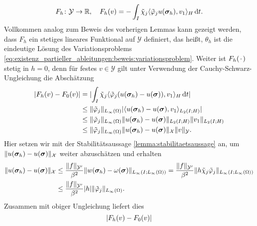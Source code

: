 \documentclass[../main.tex]{subfiles}
\begin{document}
\begin{Satz}
\begin{Beweis}
\begin{equation}
            F_{h} \colon \mathcal Y \to \mathbb{R}, \quad F_{h}(v) = - \int_{I} \tilde{\chi}_{j} \langle\tilde{\varphi}_{j}  u(\bm\sigma_{h}),v_{1}\rangle_{H} \mathop{}\!\mathrm{d} t.
        \end{equation}
        Vollkommen analog zum Beweis des vorherigen Lemmas kann gezeigt werden, dass $F_{h}$ ein stetiges lineares Funktional auf $\mathcal Y$ definiert, das heißt, $\theta_{h}$ ist die eindeutige Lösung des Variationsproblems \cref{eq:existenz_partieller_ableitungen:beweis:variationsproblem}.
        Weiter ist $F_{h}({\mkern2mu\cdot\mkern2mu})$ stetig in $h = 0$, denn für festes $v \in \mathcal Y$ gilt unter Verwendung der Cauchy-Schwarz-Ungleichung die Abschätzung
        \begin{align}
            \lvert F_{h}(v) - F_{0}(v)\rvert
            &= \lvert\int_{I} \tilde{\chi}_{j} \langle\tilde{\varphi}_{j}  (u(\bm\sigma_{h}) - u(\bm\sigma)),v_{1}\rangle_{H} \mathop{}\!\mathrm{d} t \rvert
            \\&\leq \lVert\tilde{\varphi}_{j}\rVert_{L_{\infty}(\Omega)} \lvert\langle u(\bm\sigma_{h}) - u(\bm\sigma),v_{1}\rangle_{L_{2}(I; H)} \rvert
            \\&\leq \lVert\tilde{\varphi}_{j}\rVert_{L_{\infty}(\Omega)} \lVert u(\bm\sigma_{h}) - u(\bm\sigma)\rVert_{L_{2}(I; H)} \lVert v_{1}\rVert_{L_{2}(I; H)}
            \\&\leq \lVert\tilde{\varphi}_{j}\rVert_{L_{\infty}(\Omega)} \lVert u(\bm\sigma_{h}) - u(\bm\sigma)\rVert_{\mathcal X} \lVert v\rVert_{\mathcal Y}.
        \end{align}
        Hier setzen wir mit der Stabilitätsaussage \cref{lemma:stabilitaetsaussage} an, um $\lVert u(\bm\sigma_{h}) - u(\bm\sigma)\rVert_{\mathcal X}$ weiter abzuschätzen und erhalten
        \begin{equation}
            \begin{aligned}
                \lVert u(\bm\sigma_{h}) - u(\bm\sigma)\rVert_{\mathcal X}
                &\leq \frac{\lVert f\rVert_{\mathcal Y'}}{\beta^{2}} \lVert w(\bm\sigma_{h}) - \omega(\bm\sigma)\rVert_{L_{\infty}(I; L_{\infty}(\Omega))}
                = \frac{\lVert f\rVert_{\mathcal Y'}}{\beta^{2}} \lVert h \tilde{\chi}_{j} \tilde{\varphi}_{j} \rVert_{L_{\infty}(I; L_{\infty}(\Omega))}
                \\&\leq \frac{\lVert f\rVert_{\mathcal Y'}}{\beta^{2}} \lvert h\rvert \lVert\tilde{\varphi}_{j}\rVert_{L_{\infty}(\Omega)}.
            \end{aligned}
        \end{equation}
        Zusammen mit obiger Ungleichung liefert dies
        \begin{equation}
            \abs{F_{h}(v) - F_{0}(v)}

\end{equation}
\end{Beweis}
\end{Satz}
\end{document}
